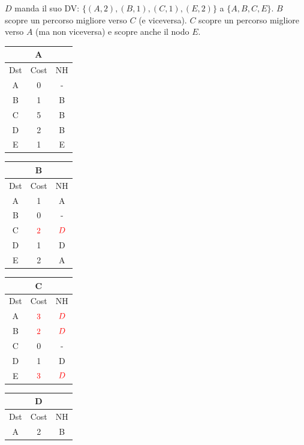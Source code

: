 \documentclass[10pt]{article}
\begin{document}
	\newline \newline
	$D$ manda il suo DV: $\{(A,2),(B,1),(C,1),(E,2)\}$ a $\{A,B,C,E\}$.
	\newline
	$B$ scopre un percorso migliore verso $C$ (e viceversa).
	\newline
	$C$ scopre un percorso migliore verso $A$ (ma non viceversa) e scopre anche il nodo $E$.
	\begin{table}[h!]
		\begin{tabular}{|c||c||c|}
 			\hline
	 		\multicolumn{3}{|c|}{A} \\
 			\hline
 			Dst & Cost & NH\\
 			\hline
 			A & 0 & - \\
 			B & 1 & B \\
 			C & 5 & B \\
 			D & 2 & B \\
 			E & 1 & E \\
 			\hline
		\end{tabular}
		\begin{tabular}{|c||c||c|}
 			\hline
	 		\multicolumn{3}{|c|}{B} \\
 			\hline
 			Dst & Cost & NH\\
 			\hline
 			A & 1 & A \\
 			B & 0 & - \\
 			C & $\color{red} 2$ & $\color{red} D$ \\
 			D & 1 & D \\
 			E & 2 & A \\
 			\hline
		\end{tabular}
		\begin{tabular}{|c||c||c|}
 			\hline
	 		\multicolumn{3}{|c|}{C} \\
 			\hline
 			Dst & Cost & NH\\
 			\hline
 			A & $\color{red} 3$ & $\color{red} D$ \\
 			B & $\color{red} 2$ & $\color{red} D$ \\
 			C & 0 & - \\
 			D & 1 & D \\
 			E & $\color{red} 3$ & $\color{red} D$ \\
 			\hline
		\end{tabular}
		\begin{tabular}{|c||c||c|}
 			\hline
	 		\multicolumn{3}{|c|}{D} \\
 			\hline
 			Dst & Cost & NH\\
 			\hline
 			A & 2 & B \\

\end{tabular}
\end{table}
\end{document}
